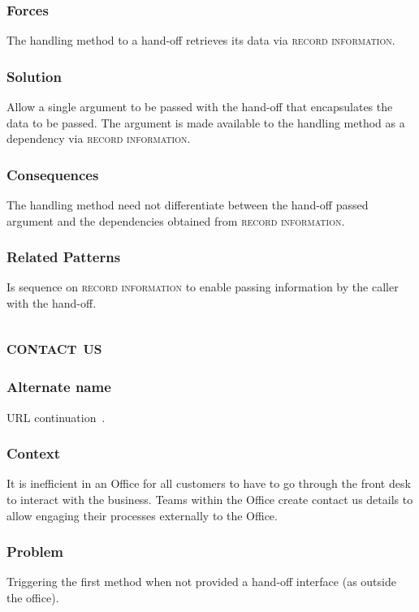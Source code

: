 \documentclass[prodmode]{style/acmlarge}
\begin{document}
\subsubsection*{Forces} The handling method to a hand-off retrieves its data via
\textsc{record information}.

\subsubsection*{Solution} Allow a single argument to be passed with the hand-off
that encapsulates the data to be passed.  The argument is made available to the
handling method as a dependency via \textsc{record information}.

\subsubsection*{Consequences} The handling method need not differentiate between
the hand-off passed argument and the dependencies obtained from \textsc{record
information}.

\subsubsection*{Related Patterns} Is sequence on \textsc{record information} to
enable passing information by the caller with the hand-off.



\subsection{\textsc{\textbf{contact us}}}

\subsubsection*{Alternate name} URL continuation~\cite{url-continuation}.

\subsubsection*{Context} It is inefficient in an Office for all customers to
have to go through the front desk to interact with the business.  Teams within
the Office create contact us details to allow engaging their processes
externally to the Office.

\subsubsection*{Problem} Triggering the first method when not provided a
hand-off interface (as outside the office).
\end{document}
